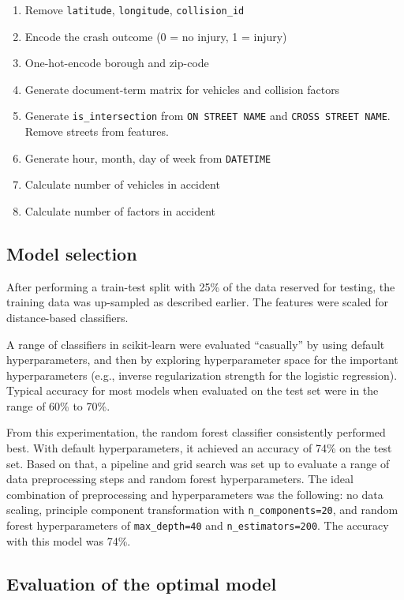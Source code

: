 \documentclass[twocolumn,oneside]{article}
\begin{document}
\begin{enumerate}

\item Remove \verb+latitude+, \verb+longitude+, \verb+collision_id+
\item Encode the crash outcome (0 = no injury, 1 = injury)
\item One-hot-encode borough and zip-code
\item Generate document-term matrix for vehicles and collision factors
\item Generate \verb+is_intersection+ from \verb+ON STREET NAME+ and
  \verb+CROSS STREET NAME+.  Remove streets from features.
\item Generate hour, month, day of week from \verb+DATETIME+
\item Calculate number of vehicles in accident
\item Calculate number of factors in accident

\end{enumerate}


\subsection{Model selection}

After performing a train-test split with 25\% of the data reserved for
testing, the training data was up-sampled as described earlier.  The
features were scaled for distance-based classifiers.

A range of classifiers in scikit-learn were evaluated ``casually'' by
using default hyperparameters, and then by exploring hyperparameter
space for the important hyperparameters (e.g., inverse regularization
strength for the logistic regression).  Typical accuracy for most
models when evaluated on the test set were in the range of 60\% to
70\%.

From this experimentation, the random forest classifier consistently
performed best.  With default hyperparameters, it achieved an accuracy
of 74\% on the test set.  Based on that, a pipeline and grid search
was set up to evaluate a range of data preprocessing steps and random
forest hyperparameters.  The ideal combination of preprocessing and
hyperparameters was the following: no data scaling, principle
component transformation with \verb+n_components=20+, and random
forest hyperparameters of \verb+max_depth=40+ and
\verb+n_estimators=200+.  The accuracy with this model was 74\%.

\subsection{Evaluation of the optimal model}
\end{document}

